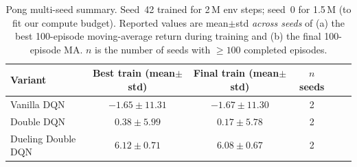 \begin{table}[h]\centering\small
\caption{Pong multi-seed summary. Seed~42 trained for 2\,M env steps; seed~0 for 1.5\,M (to fit our compute budget). Reported values are mean$\pm$std \emph{across seeds} of (a) the best 100-episode moving-average return during training and (b) the final 100-episode MA. $n$ is the number of seeds with $\geq 100$ completed episodes.}
\label{tab:pong_multiseed}
\begin{tabular}{lccccc}
\toprule
Variant & Best train (mean$\pm$std) & Final train (mean$\pm$std) & $n$ seeds \\
\midrule
Vanilla DQN & $-1.65\pm11.31$ & $-1.67\pm11.30$ & 2 \\
Double DQN & $0.38\pm5.99$ & $0.17\pm5.78$ & 2 \\
Dueling Double DQN & $6.12\pm0.71$ & $6.08\pm0.67$ & 2 \\
\bottomrule
\end{tabular}
\end{table}
